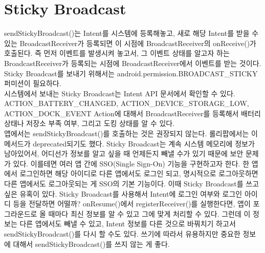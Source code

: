 \section{Sticky Broadcast}
sendStickyBroadcast()는 Intent를 시스템에 등록해놓고, 새로 해당 Intent를 받을 수 있는 BroadcastReceiver가 등록되면 이 시점에 BroadcastReceiver의 onReceive()가 호출된다. 즉 먼저 이벤트를 발생시켜 놓고서, 그 이벤트 상태를 알고자 하는 BroadcastReceiver가 등록되는 시점에 BroadcastReceiver에서 이벤트를 받는 것이다.
Sticky Broadcast를 보내기 위해서는 android.permission.BROADCAST\_STICKY 퍼미션이 필요하다.\\

시스템에서 보내는 Sticky Broadcast는 Intent API 문서에서 확인할 수 있다. ACTION\-\_BATTERY\-\_CHAN\-GED, ACTION\_DEVICE\_STORAGE\_LOW, ACTION\_DOCK\_EVENT Action에 대해서 BroadcastReceiver를 등록해서 배터리 상태나 저장소 부족 여부, 그리고 도킹 상태를 알 수 있다.\\

앱에서는 sendStickyBroadcast()를 호출하는 것은 권장되지 않는다. 롤리팝에서는 이 메서드가 deprecated되기도 했다.
Sticky Broadcast는 계속 시스템 메모리에 정보가 남아있어서, 어디선가 정보를 알고 싶을 때 언제든지 빼낼 수가 있기 때문에 보안 문제가 있다.
이를테면 여러 앱 간에 SSO(Single Sign-On) 기능을 구현하고자 한다. 
한 앱에서 로그인하면 해당 아이디로 다른 앱에서도 로그인 되고, 명시적으로 로그아웃하면 다른 앱에서도 로그아웃되는 게 SSO의 기본 기능이다. 이때 Sticky Broadcast를 쓰고 싶은 유혹이 있다. 
Sticky Broadcast를 사용해서 Intent에 로그인 여부와 로그인 아이디 등을 전달하면 어떨까? 
onResume()에서 registerReceiver()를 실행한다면, 앱이 포그라운드로 올 때마다 최신 정보를 알 수 있고 그에 맞게 처리할 수 있다. 그런데 이 정보는 다른 앱에서도 빼낼 수 있고, Intent 정보를 다른 것으로 바꿔치기 하고서 sendStickyBroadcast()를 다시 할 수도 있다.
쓰기에 따라서 유용하지만 중요한 정보에 대해서 sendStickyBroadcast()를 쓰지 않는 게 좋다. 

\begin{comment}
onReceive 메서드가 끝나면, BroadcastReceiver가 끝나서, 스레드로 작업 할 수는 없으므로, 
일반적으로 시간이 오래 걸리는 작업이 있다면, BroadcastReceiver에서 Service를 실행시킨다.

내부적으로 unregister를 하고 있다.
LoadedApk?
07-01 10:28:19.472: E/ActivityThread(4568): Activity com.suribada.misc.BroadcastRecieverActivity has leaked IntentReceiver \verb|com.suribada.misc.BroadcastRecieverActivity$1@b5a4f558 that was originally registered here. Are you missing a call to unregisterReceiver()?|
\end{comment}

